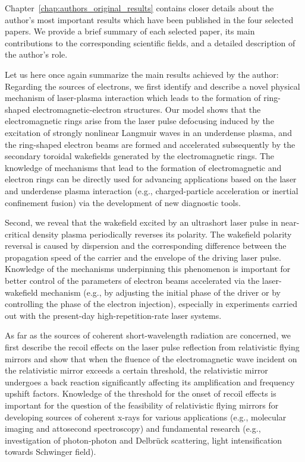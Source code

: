 \documentclass[10pt, a4paper, twoside, openright]{report}
\begin{document}
Chapter~\ref{chap:authors_original_results} contains closer details about the author's most important results which have been published in the four selected papers. We provide a brief summary of each selected paper, its main contributions to the corresponding scientific fields, and a detailed description of the author's role.

Let us here once again summarize the main results achieved by the author: Regarding the sources of electrons, we first identify and describe a novel physical mechanism of laser-plasma interaction which leads to the formation of ring-shaped electromagnetic-electron structures. Our model shows that the electromagnetic rings arise from the laser pulse defocusing induced by the excitation of strongly nonlinear Langmuir waves in an underdense plasma, and the ring-shaped electron beams are formed and accelerated subsequently by the secondary toroidal wakefields generated by the electromagnetic rings. The knowledge of mechanisms that lead to the formation of electromagnetic and electron rings can be directly used for advancing applications based on the laser and underdense plasma interaction (e.g., charged-particle acceleration or inertial confinement fusion) via the development of new diagnostic tools. 

Second, we reveal that the wakefield excited by an ultrashort laser pulse in near-critical density plasma periodically reverses its polarity. The wakefield polarity reversal is caused by dispersion and the corresponding difference between the propagation speed of the carrier and the envelope of the driving laser pulse. Knowledge of the mechanisms underpinning this phenomenon is important for better control of the parameters of electron beams accelerated via the laser-wakefield mechanism (e.g., by adjusting the initial phase of the driver or by controlling the phase of the electron injection), especially in experiments carried out with the present-day high-repetition-rate laser systems.

As far as the sources of coherent short-wavelength radiation are concerned, we first describe the recoil effects on the laser pulse reflection from relativistic flying mirrors and show that when the fluence of the electromagnetic wave incident on the relativistic mirror exceeds a certain threshold, the relativistic mirror undergoes a back reaction significantly affecting its amplification and frequency upshift factors. Knowledge of the threshold for the onset of recoil effects is important for the question of the feasibility of relativistic flying mirrors for developing sources of coherent x-rays for various applications (e.g., molecular imaging and attosecond spectroscopy) and fundamental research (e.g., investigation of photon-photon and Delbrück scattering, light intensification towards Schwinger field).
\end{document}
